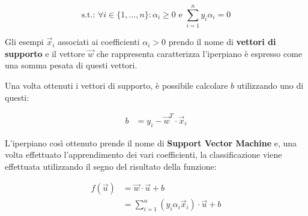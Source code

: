 $$ \text{s.t.: } \forall i \in \{1, \ldots, n\} : \alpha_i \geq 0 \text{ e } \sum\limits_{i=1}^n y_i \alpha_i = 0$$

Gli esempi $\vec{x}_i$ associati ai coefficienti $\alpha_i > 0$ prendo il nome di \textbf{vettori di supporto} e il vettore $\vec{w}$ che rappresenta caratterizza l'iperpiano è espresso come una somma pesata di questi vettori.

Una volta ottenuti i vettori di supporto, è possibile calcolare $b$ utilizzando uno di questi:

\begin{align*}
b &= y_i - \vec{w}^T \cdot \vec{x}_i
\end{align*}

L'iperpiano così ottenuto prende il nome di \textbf{Support Vector Machine} e, una volta effettuato l'apprendimento dei vari coefficienti, la classificazione viene effettuata utilizzando il segno del risultato della funzione:

\begin{align*}
f(\vec{u}) &= \vec{w} \cdot \vec{u} + b \\
	  &= \sum\limits_{i = 1}^n (y_i  \alpha_i  \vec{x}_i ) \cdot \vec{u} + b
\end{align*}

